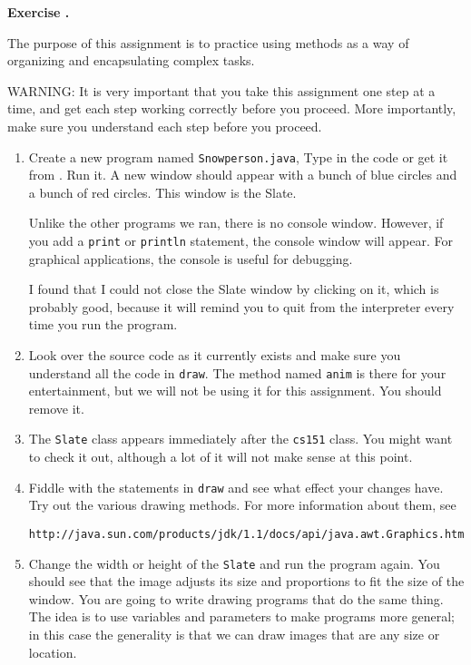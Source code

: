 \documentclass{book}
\newcounter{exercisenum}
\renewcommand{\theexercisenum}{{\thechapter}.\arabic{exercisenum}}
\newenvironment{exercisesize}{\begin{small}}{\end{small}}
\newcommand{\exerciseheader}[2]{                                          
     
  \begin{exercisesize}                                                    
     
     
  \def\theenumi{\alph{enumi}}                                             
  \def\labelenumi{\theenumi.}                                             
  \def\theenumii{\roman{enumii}}                                          
  \def\labelenumii{\theenumii.}                                           
  {\bf Exercise {#1}{#2}}\hspace{0.1in}                 
}
\newcommand{\startexercise}[1]{%
  \refstepcounter{exercisenum}                                            
  \exerciseheader{\theexercisenum}{#1}                                    
}
\newcommand{\stopexercise}{%
  {\hfill}                                                               
  \end{exercisesize}      
}
\newcommand{\normaldif}{}
\newenvironment{exercise}{\startexercise{\normaldif{}}}{\stopexercise}
\begin{document}
\begin{exercise}

The purpose of this assignment is to practice using methods
as a way of organizing and encapsulating complex tasks.

WARNING:  It is very important that you take this assignment
one step at a time, and get each step working correctly before
you proceed.  More importantly, make sure you understand each
step before you proceed.

\begin{enumerate}

\item
Create a new program named {\tt Snowperson.java},
Type in the code or get it from \url{}.
Run it.
A new window should appear with a bunch of blue circles and
a bunch of red circles.  This window is the Slate.

Unlike the other programs we ran, there is no console window.
However, if you add a {\tt print}
or {\tt println} statement, the console window will appear.
For graphical applications, the console is
useful for debugging.

I found that I could not close the Slate window by clicking on it,
which is probably good, because it will remind you to quit
from the interpreter every time you run the program.

\item Look over the source code as it currently exists and make
sure you understand all the code in {\tt draw}.  The method
named {\tt anim} is there for your entertainment, but we will
not be using it for this assignment.  You should remove it.

\item The {\tt Slate} class
appears immediately after the {\tt cs151} class.  You
might want to check it out, although a lot of it will not make
sense at this point.

\item Fiddle with the statements in {\tt draw}
and see what effect your changes have.  Try out the various
drawing methods.  For more information about them, see

\begin{verbatim}
http://java.sun.com/products/jdk/1.1/docs/api/java.awt.Graphics.html
\end{verbatim}

\item Change the width or height of the {\tt Slate} and run the
program again.  You should see that the image adjusts its size
and proportions to fit the size of the window.  You are going to
write drawing programs that do the same thing.  The idea is to
use variables and parameters to make programs more general; in
this case the generality is that we can draw images that are any
size or location.


\end{enumerate}
\end{exercise}
\end{document}
